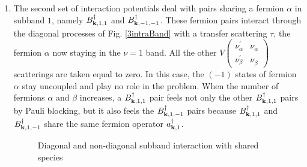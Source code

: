 \documentclass[11pt]{article} %
\begin{document}
\begin{enumerate}
\begin{figure}[hhtb]
\end{figure}
\item The second set of interaction potentials deal with pairs sharing a fermion $\alpha$ in subband $1$, namely $B^{\dagger}_{\mathbf{k},1,1}$ and $B^{\dagger}_{\mathbf{k},-1,-1}$. These fermion pairs interact through the diagonal processes of Fig. \ref{3intraBand} with a transfer scattering $\tau$, the fermion $\alpha$ now staying in the $\nu=1$ band.  All the other $V 
\left(\begin{smallmatrix}\nu_{\alpha}^{'}&\nu_{\alpha}^{}\\ \nu_{\beta}^{'}&\nu_{\beta}^{}\end{smallmatrix}\right)$ scatterings are taken equal to zero.  In this case, the $(-1)$ states of fermion $\alpha$ stay uncoupled and play no role in the problem.  When the number of fermions $\alpha$ and $\beta$ increases, a $B^{\dagger}_{\mathbf{k},1,1}$ pair feels not only the other $B^{\dagger}_{\mathbf{k},1,1}$ pairs by Pauli blocking, but it also feels the $B^{\dagger}_{\mathbf{k},1,-1}$ pairs because $B^{\dagger}_{\mathbf{k},1,1}$ and $B^{\dagger}_{\mathbf{k},1,-1}$ share the same fermion operator $a^{\dagger}_{\mathbf{k},1}$.
\begin{figure}[hhtb]
	\centering
	         \quad
	\caption{Diagonal and non-diagonal subband interaction with shared species}
\end{figure}
\end{enumerate}
\end{document}
